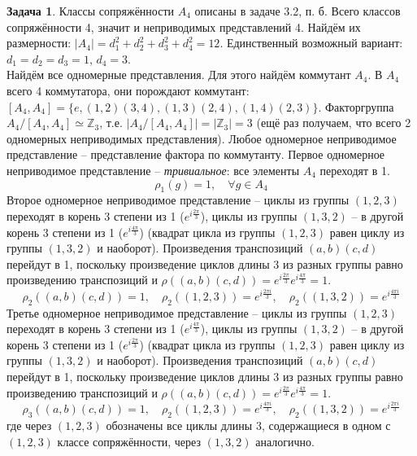 \documentclass[12pt]{article}
\theoremstyle{definition}
\newtheorem{zad}{Задача}[section]
\begin{document}
\begin{zad}
Классы сопряжённости $A_4$ описаны в задаче 3.2, п. б. Всего классов сопряжённости 4, значит и неприводимых представлений 4. Найдём их размерности: $|A_4|=d_1^2+d_2^2+d_3^2+d_4^2=12$. Единственный возможный вариант: $d_1=d_2=d_3=1$, $d_4=3$.\\
Найдём все одномерные представления. Для этого найдём коммутант $A_4$. В $A_4$ всего 4 коммутатора, они порождают коммутант: $[A_4,A_4]=\{e, (1,2)(3,4), (1,3)(2,4), (1,4)(2,3)\}$. Факторгруппа $A_4/[A_4,A_4]\simeq\mathbb{Z}_3$, т.е. $|A_4/[A_4,A_4]|=|\mathbb{Z}_3|=3$ (ещё раз получаем, что всего 2 одномерных неприводимых представления). Любое одномерное неприводимое представление -- представление фактора по коммутанту. Первое одномерное неприводимое представление -- \textit{тривиальное}: все элементы $A_4$ переходят в 1.
\begin{equation}
    \rho_1(g)=1, \quad \forall g\in A_4
\end{equation}
Второе одномерное неприводимое представление -- циклы из группы $(1,2,3)$ переходят в корень 3 степени из 1 ($e^{i\frac{2\pi}{3}}$), циклы из группы $(1,3,2)$ -- в другой корень 3 степени из 1 ($e^{i\frac{4\pi}{3}}$) (квадрат цикла из группы $(1,2,3)$ равен циклу из группы $(1,3,2)$ и наоборот). Произведения транспозиций $(a,b)(c,d)$ перейдут в 1, поскольку произведение циклов длины 3 из разных группы равно произведению транспозиций и $\rho((a,b)(c,d))=e^{i\frac{2\pi}{3}}e^{i\frac{4\pi}{3}}=1$.
\begin{equation}
    \rho_2((a,b)(c,d))=1,\quad \rho_2((1,2,3))=e^{i\frac{2\pi i}{3}},\quad \rho_2((1,3,2))=e^{i\frac{4\pi i}{3}}
\end{equation}
Третье одномерное неприводимое представление -- циклы из группы $(1,2,3)$ переходят в корень 3 степени из 1 ($e^{i\frac{4\pi}{3}}$), циклы из группы $(1,3,2)$ -- в другой корень 3 степени из 1 ($e^{i\frac{2\pi}{3}}$) (квадрат цикла из группы $(1,2,3)$ равен циклу из группы $(1,3,2)$ и наоборот). Произведения транспозиций $(a,b)(c,d)$ перейдут в 1, поскольку произведение циклов длины 3 из разных группы равно произведению транспозиций и $\rho((a,b)(c,d))=e^{i\frac{2\pi}{3}}e^{i\frac{4\pi}{3}}=1$.
\begin{equation}
    \rho_3((a,b)(c,d))=1,\quad \rho_2((1,2,3))=e^{i\frac{4\pi i}{3}},\quad \rho_2((1,3,2))=e^{i\frac{2\pi i}{3}}
\end{equation}
где через $(1,2,3)$ обозначены все циклы длины 3, содержащиеся в одном с $(1,2,3)$ классе сопряжённости, через $(1,3,2)$ аналогично.\\

\end{zad}
\end{document}
